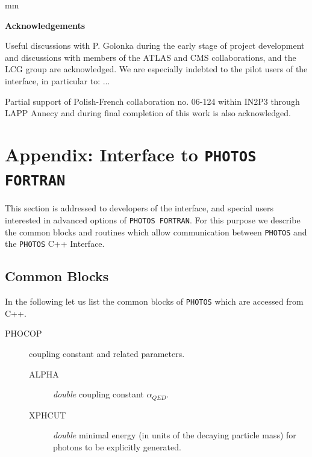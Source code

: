 \documentclass[]{Photos_interface_design}
\begin{document}
 mm

\centerline{\large\bf Acknowledgements}


Useful discussions with P. Golonka during the early stage of project development and discussions 
with members of the ATLAS and CMS collaborations, and the LCG group are acknowledged.
We are especially indebted to the pilot users of the interface, in particular to:
...

Partial support of Polish-French collaboration
no. 06-124 within IN2P3 through LAPP Annecy and 
during final completion of this work is
also acknowledged.

\newpage

{}







\newpage
\appendix

\section{Appendix: Interface to {\tt PHOTOS FORTRAN}}
\label{Interface to PHOTOS}

This section is addressed to developers of the interface, 
and special users interested in advanced options of {\tt PHOTOS FORTRAN}.
For this purpose we describe the common blocks and routines which allow
communication between {\tt PHOTOS} and the {\tt PHOTOS} C++ Interface.

\subsection{Common Blocks}

In the following let us list the common blocks of {\tt PHOTOS} which are accessed
from C++.

\begin{description}
\item[PHOCOP] coupling constant and related parameters.
    \begin{description}
	\item[ALPHA]  \textit{double} coupling constant $\alpha_{QED}$.
	\item[XPHCUT] \textit{double} minimal energy (in units of the decaying particle mass) for photons to be explicitly generated.
    \end{description}
\end{description}
\end{document}

